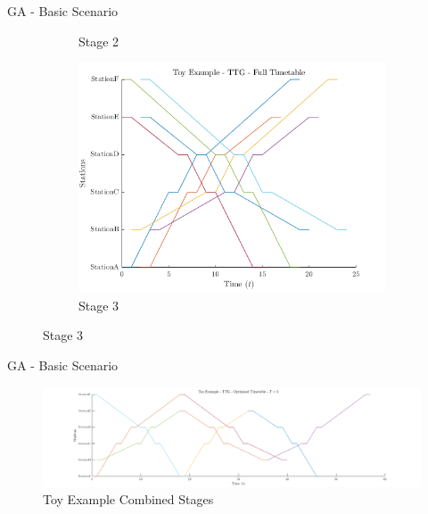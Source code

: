 \documentclass[aspectratio=169]{beamer}
\begin{document}
\begin{frame}{GA - Basic Scenario}
\begin{figure}
\begin{subfigure}[t]{0.3\textwidth}
            \caption{Stage 2}
            \label{fig:ga-stage2}
        \end{subfigure}
        \begin{subfigure}[t]{0.3\textwidth}
            \centering
            \includegraphics[width=\linewidth]{assets/GA/toy3.png}
            \caption{Stage 3}
            \label{fig:ga-stage3}
        \end{subfigure}
    \end{figure}
\end{frame}

\begin{frame}{GA - Basic Scenario}
    \begin{figure}
        \centering
        \includegraphics[width=\textwidth]{assets/GA/toy4.png}
        \caption{Toy Example Combined Stages}
        \label{fig:ga-toy-stages}
    \end{figure}
\end{frame}
\end{document}
